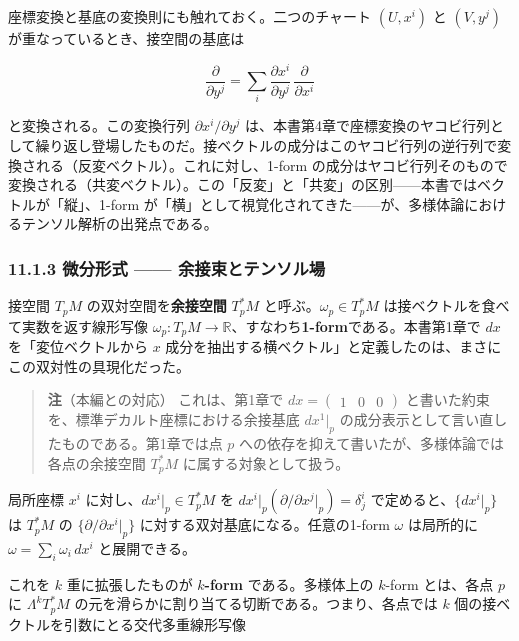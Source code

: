 \documentclass[a4paper,12pt,openany]{book}
\begin{document}
座標変換と基底の変換則にも触れておく。二つのチャート \((U, x^i)\) と
\((V, y^j)\) が重なっているとき、接空間の基底は

\[\frac{\partial}{\partial y^j} = \sum_i \frac{\partial x^i}{\partial y^j}\,\frac{\partial}{\partial x^i}\]

と変換される。この変換行列 \(\partial x^i/\partial y^j\)
は、本書第4章で座標変換のヤコビ行列として繰り返し登場したものだ。接ベクトルの成分はこのヤコビ行列の逆行列で変換される（反変ベクトル）。これに対し、1-form
の成分はヤコビ行列そのもので変換される（共変ベクトル）。この「反変」と「共変」の区別——本書ではベクトルが「縦」、1-form
が「横」として視覚化されてきた——が、多様体論におけるテンソル解析の出発点である。

\hypertarget{ux5faeux5206ux5f62ux5f0f-ux4f59ux63a5ux675fux3068ux30c6ux30f3ux30bdux30ebux5834}{%
\subsubsection{11.1.3 微分形式 ——
余接束とテンソル場}\label{ux5faeux5206ux5f62ux5f0f-ux4f59ux63a5ux675fux3068ux30c6ux30f3ux30bdux30ebux5834}}

接空間 \(T_p M\) の双対空間を\textbf{余接空間} \(T_p^* M\)
と呼ぶ。\(\omega_p \in T_p^* M\) は接ベクトルを食べて実数を返す線形写像
\(\omega_p: T_p M \to \mathbb{R}\)、すなわち\textbf{1-form}である。本書第1章で
\(dx\) を「変位ベクトルから \(x\)
成分を抽出する横ベクトル」と定義したのは、まさにこの双対性の具現化だった。

\begin{quote}
\textbf{注}（本編との対応） これは、第1章で
\(dx=\begin{pmatrix}1&0&0\end{pmatrix}\)
と書いた約束を、標準デカルト座標における余接基底 \(dx^1|_p\)
の成分表示として言い直したものである。第1章では点 \(p\)
への依存を抑えて書いたが、多様体論では各点の余接空間 \(T_p^* M\)
に属する対象として扱う。
\end{quote}

局所座標 \(x^i\) に対し、\(dx^i|_p \in T_p^* M\) を
\(dx^i|_p(\partial/\partial x^j|_p) = \delta^i_j\)
で定めると、\(\{dx^i|_p\}\) は \(T_p^* M\) の
\(\{\partial/\partial x^i|_p\}\) に対する双対基底になる。任意の1-form
\(\omega\) は局所的に \(\omega = \sum_i \omega_i\,dx^i\) と展開できる。

これを \(k\) 重に拡張したものが \textbf{$k$-form} である。多様体上の
\(k\)-form とは、各点 \(p\) に \(\Lambda^k T_p^* M\)
の元を滑らかに割り当てる切断である。つまり、各点では \(k\)
個の接ベクトルを引数にとる交代多重線形写像
\end{document}
